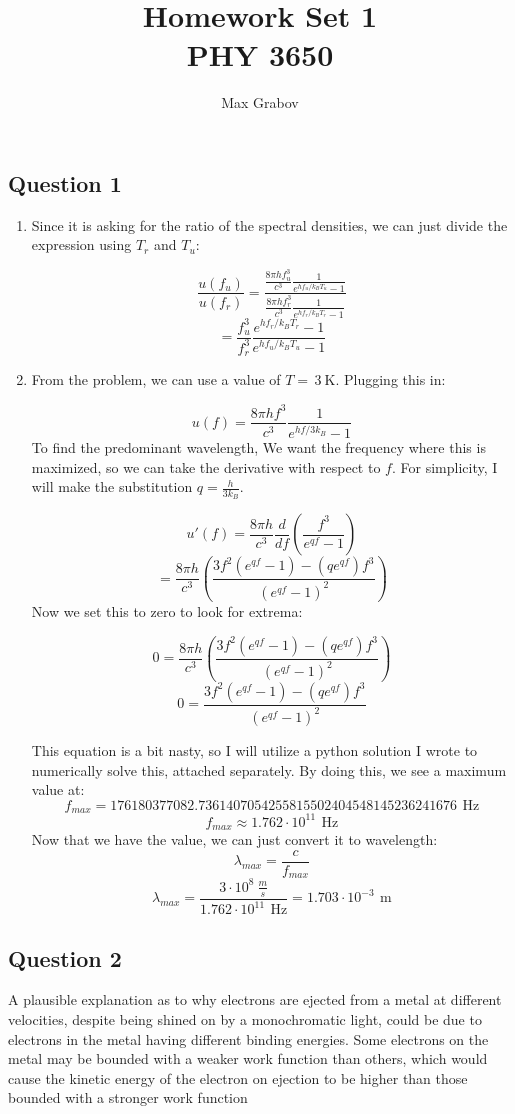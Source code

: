 \documentclass{article}
\title{Homework Set 1\\PHY 3650}
\author{Max Grabov}
\begin{document}
\maketitle
\subsection*{Question 1}
\begin{enumerate}[label=\alph*)]
\item
Since it is asking for the ratio of the spectral densities, we can just divide the expression using $T_r$ and $T_u$:

\[\frac{u(f_u)}{u(f_r)} = \frac{\frac{8\pi hf_u^3}{c^3}\frac{1}{e^{{hf_u}/{k_BT_u}} - 1}}{\frac{8\pi hf_r^3}{c^3}\frac{1}{e^{{hf_r}/{k_BT_r}} - 1}}\]
\[=\frac{f_u^3}{f_r^3}\frac{e^{{hf_r}/{k_BT_r}} - 1}{e^{{hf_u}/{k_BT_u}} - 1}\]
\item
From the problem, we can use a value of $T=\,\SI{3}{\kelvin}$. Plugging this in:

\[u(f) = {\frac{8\pi hf^3}
{c^3}}\frac{1}{e^{{hf}/{3k_B}} - 1}\]
To find the predominant wavelength, We want the frequency where this is maximized, so we can take the derivative with respect to $f$. For simplicity, I will make the substitution $q = \frac{h}{3k_B}$.

\[u'(f) = \frac{8\pi h}{c^3}\frac{d}{df}(\frac{f^3}{e^{{qf}} - 1})\]
\[=\frac{8\pi h}{c^3}(\frac{3f^2(e^{qf} - 1) - (qe^{qf})f^3}{(e^{qf} - 1)^2})\]
Now we set this to zero to look for extrema:

\[0=\frac{8\pi h}{c^3}(\frac{3f^2(e^{qf} - 1) - (qe^{qf})f^3}{(e^{qf} - 1)^2})\]
\[0=\frac{3f^2(e^{qf} - 1) - (qe^{qf})f^3}{(e^{qf} - 1)^2}\]

This equation is a bit nasty, so I will utilize a python solution I wrote to numerically solve this, attached separately. By doing this, we see a maximum value at: \[f_{max}=176180377082.7361407054255815502404548145236241676\,\SI{}{\hertz}\]
\[f_{max}\approx1.762\cdot10^{11}\,\SI{}{\hertz}\]
Now that we have the value, we can just convert it to wavelength:
\[\lambda_{max} = \frac{c}{f_{max}}\]
\[\lambda_{max} = \frac{3\cdot10^8\SI{}{\frac{m}{s}}}{1.762\cdot10^{11}\,\SI{}{\hertz}} = 1.703\cdot10^{-3}\,\SI{}{\meter}\]

\end{enumerate}

\subsection*{Question 2}
A plausible explanation as to why electrons are ejected from a metal at different velocities, despite being shined on by a monochromatic light, could be due to electrons in the metal having different binding energies.
Some electrons on the metal may be bounded with a weaker work function than others, which would cause the kinetic energy of the electron on ejection to be higher than those bounded with a stronger work function
\end{document}
